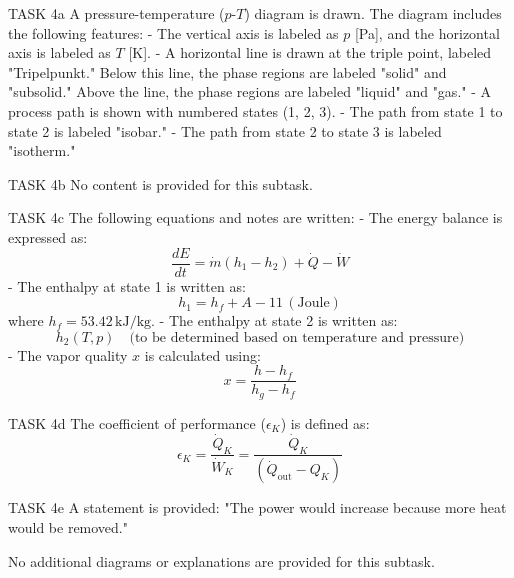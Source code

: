 TASK 4a  
A pressure-temperature (\( p \)-\( T \)) diagram is drawn. The diagram includes the following features:  
- The vertical axis is labeled as \( p \) [Pa], and the horizontal axis is labeled as \( T \) [K].  
- A horizontal line is drawn at the triple point, labeled "Tripelpunkt." Below this line, the phase regions are labeled "solid" and "subsolid." Above the line, the phase regions are labeled "liquid" and "gas."  
- A process path is shown with numbered states (1, 2, 3).  
  - The path from state 1 to state 2 is labeled "isobar."  
  - The path from state 2 to state 3 is labeled "isotherm."  

TASK 4b  
No content is provided for this subtask.  

TASK 4c  
The following equations and notes are written:  
- The energy balance is expressed as:  
  \[
  \frac{dE}{dt} = \dot{m} (h_1 - h_2) + \dot{Q} - \dot{W}
  \]  
- The enthalpy at state 1 is written as:  
  \[
  h_1 = h_f + A - 11 \, (\text{Joule})
  \]  
  where \( h_f = 53.42 \, \text{kJ/kg} \).  
- The enthalpy at state 2 is written as:  
  \[
  h_2(T, p) \quad \text{(to be determined based on temperature and pressure)}  
  \]  
- The vapor quality \( x \) is calculated using:  
  \[
  x = \frac{h - h_f}{h_g - h_f}
  \]  

TASK 4d  
The coefficient of performance (\( \epsilon_K \)) is defined as:  
\[
\epsilon_K = \frac{\dot{Q}_K}{\dot{W}_K} = \frac{\dot{Q}_K}{(\dot{Q}_{\text{out}} - Q_K)}
\]  

TASK 4e  
A statement is provided:  
"The power would increase because more heat would be removed."  

No additional diagrams or explanations are provided for this subtask.